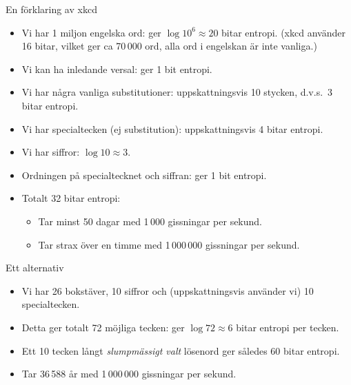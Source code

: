 \documentclass{beamer}
\begin{document}
\begin{frame}{En förklaring av xkcd}
  \begin{itemize}
    \item Vi har 1 miljon engelska ord: ger \(\log 10^6 \approx 20\) bitar 
      entropi.
      (xkcd använder 16 bitar, vilket ger ca 70\,000 ord, alla ord i engelskan 
      är inte vanliga.)

    \item Vi kan ha inledande versal: ger 1 bit entropi.

    \item Vi har några vanliga substitutioner: uppskattningsvis 10 stycken, 
      d.v.s.~3 bitar entropi.

    \item Vi har specialtecken (ej substitution): uppskattningsvis 4 bitar 
      entropi.

    \item Vi har siffror: \(\log 10\approx 3\).

    \item Ordningen på specialtecknet och siffran: ger 1 bit entropi.

    \item Totalt 32 bitar entropi:
      \begin{itemize}
        \item Tar minst 50 dagar med 1\,000 gissningar per sekund.
        \item Tar strax över en timme med 1\,000\,000 gissningar per sekund.
      \end{itemize}

  \end{itemize}
\end{frame}

\begin{frame}
  \begin{example}{Ett alternativ}
    \begin{itemize}
      \item Vi har 26 bokstäver, 10 siffror och (uppskattningsvis använder vi) 
        10 specialtecken.

      \item Detta ger totalt 72 möjliga tecken: ger \(\log 72\approx 6\) bitar 
        entropi per tecken.

      \item Ett 10 tecken långt \emph{slumpmässigt valt} lösenord ger således 
        60 bitar entropi.

      \item Tar 36\,588 år med 1\,000\,000 gissningar per sekund.

    \end{itemize}
  \end{example}
\end{frame}
\end{document}
